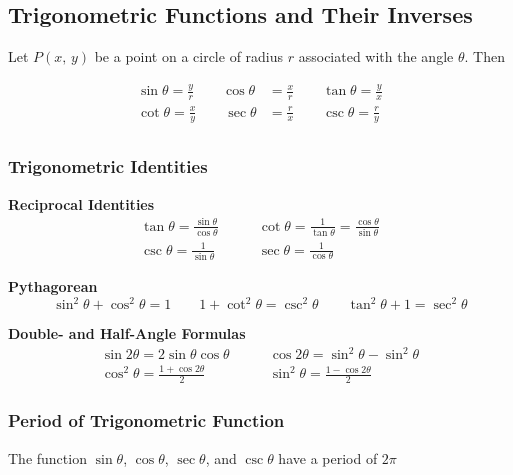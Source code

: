 %
%
%

\subsection{Trigonometric Functions and Their Inverses}
Let $P(x,\, y)$ be a point on a circle of radius $r$ associated with the angle $\theta$. Then

\begin{align}
    \sin\theta = \frac{y}{r} \qquad \cos\theta &= \frac{x}{r} \qquad \tan\theta = \frac{y}{x} \\
    \cot\theta = \frac{x}{y} \qquad \sec\theta &= \frac{r}{x} \qquad \csc\theta = \frac{r}{y} \\
\end{align}

\subsubsection{Trigonometric Identities}
\noindent\textbf{Reciprocal Identities}
\begin{align}
    \tan\theta = \frac{\sin\theta}{\cos\theta} &\qquad \cot\theta = \frac{1}{\tan\theta} = \frac{\cos\theta}{\sin\theta} \\
    \csc\theta = \frac{1}{\sin\theta} &\qquad \sec\theta = \frac{1}{\cos\theta}
\end{align}

\noindent\textbf{Pythagorean}
\begin{equation}
    \sin^2\theta + \cos^2\theta = 1 \qquad 1 + \cot^2\theta = \csc^2\theta \qquad \tan^2\theta + 1 = \sec^2\theta
\end{equation}

\noindent\textbf{Double- and Half-Angle Formulas}
\begin{align}
    \sin 2\theta = 2\sin\theta \cos\theta &\qquad \cos 2\theta = \sin^2\theta - \sin^2\theta \\
    \cos^2\theta = \frac{1 + \cos 2\theta}{2} &\qquad \sin^2\theta = \frac{1 - \cos 2\theta}{2}
\end{align}

\subsubsection{Period of Trigonometric Function}
The function $\sin\theta$, $\cos\theta$, $\sec\theta$, and $\csc\theta$ have a period of $2\pi$

